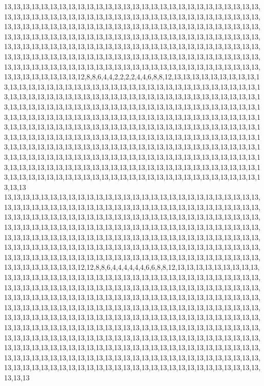 13,13,13,13,13,13,13,13,13,13,13,13,13,13,13,13,13,13,13,13,13,13,13,13,13,13,13,13,13,13,13,13,13,13,13,13,13,13,13,13,13,13,13,13,13,13,13,13,13,13,13,13,13,13,13,13,13,13,13,13,13,13,13,13,13,13,13,13,13,13,13,13,13,13,13,13,13,13,13,13,13,13,13,13,13,13,13,13,13,13,13,13,13,13,13,13,13,13,13,13,13,13,13,13,13,13,13,13,13,13,13,13,13,13,13,13,13,13,13,13,13,13,13,13,13,13,13,13,13,13,13,13,13,13,13,13,13,13,13,13,13,13,13,13,13,13,13,13,13,13,13,13,13,13,13,13,13,13,13,13,13,13,13,13,13,13,13,13,13,13,13,13,13,13,13,13,13,13,13,13,13,13,13,13,13,13,13,13,13,13,13,13,13,13,13,13,13,13,13,13,13,13,13,13,12,8,8,6,4,4,2,2,2,2,4,4,6,8,8,12,13,13,13,13,13,13,13,13,13,13,13,13,13,13,13,13,13,13,13,13,13,13,13,13,13,13,13,13,13,13,13,13,13,13,13,13,13,13,13,13,13,13,13,13,13,13,13,13,13,13,13,13,13,13,13,13,13,13,13,13,13,13,13,13,13,13,13,13,13,13,13,13,13,13,13,13,13,13,13,13,13,13,13,13,13,13,13,13,13,13,13,13,13,13,13,13,13,13,13,13,13,13,13,13,13,13,13,13,13,13,13,13,13,13,13,13,13,13,13,13,13,13,13,13,13,13,13,13,13,13,13,13,13,13,13,13,13,13,13,13,13,13,13,13,13,13,13,13,13,13,13,13,13,13,13,13,13,13,13,13,13,13,13,13,13,13,13,13,13,13,13,13,13,13,13,13,13,13,13,13,13,13,13,13,13,13,13,13,13,13,13,13,13,13,13,13,13,13,13,13,13,13,13,13,13,13,13,13,13,13,13,13,13,13,13,13,13,13,13,13,13,13,13,13,13,13,13,13,13,13,13,13,13,13,13,13,13,13,13,13,13,13,13,13,13,13,13,13,13,13,13,13,13,13,13,13,13,13,13,13,13,13,13,13,13,13,13,13,13,13,13,13,13,13,13,13,13,13,13,13,13,13,13,13,13,13,13,13,13,13,13,13
13,13,13,13,13,13,13,13,13,13,13,13,13,13,13,13,13,13,13,13,13,13,13,13,13,13,13,13,13,13,13,13,13,13,13,13,13,13,13,13,13,13,13,13,13,13,13,13,13,13,13,13,13,13,13,13,13,13,13,13,13,13,13,13,13,13,13,13,13,13,13,13,13,13,13,13,13,13,13,13,13,13,13,13,13,13,13,13,13,13,13,13,13,13,13,13,13,13,13,13,13,13,13,13,13,13,13,13,13,13,13,13,13,13,13,13,13,13,13,13,13,13,13,13,13,13,13,13,13,13,13,13,13,13,13,13,13,13,13,13,13,13,13,13,13,13,13,13,13,13,13,13,13,13,13,13,13,13,13,13,13,13,13,13,13,13,13,13,13,13,13,13,13,13,13,13,13,13,13,13,13,13,13,13,13,13,13,13,13,13,13,13,13,13,13,13,13,13,13,13,13,13,13,13,12,12,8,8,6,4,4,4,4,4,4,6,6,8,8,12,13,13,13,13,13,13,13,13,13,13,13,13,13,13,13,13,13,13,13,13,13,13,13,13,13,13,13,13,13,13,13,13,13,13,13,13,13,13,13,13,13,13,13,13,13,13,13,13,13,13,13,13,13,13,13,13,13,13,13,13,13,13,13,13,13,13,13,13,13,13,13,13,13,13,13,13,13,13,13,13,13,13,13,13,13,13,13,13,13,13,13,13,13,13,13,13,13,13,13,13,13,13,13,13,13,13,13,13,13,13,13,13,13,13,13,13,13,13,13,13,13,13,13,13,13,13,13,13,13,13,13,13,13,13,13,13,13,13,13,13,13,13,13,13,13,13,13,13,13,13,13,13,13,13,13,13,13,13,13,13,13,13,13,13,13,13,13,13,13,13,13,13,13,13,13,13,13,13,13,13,13,13,13,13,13,13,13,13,13,13,13,13,13,13,13,13,13,13,13,13,13,13,13,13,13,13,13,13,13,13,13,13,13,13,13,13,13,13,13,13,13,13,13,13,13,13,13,13,13,13,13,13,13,13,13,13,13,13,13,13,13,13,13,13,13,13,13,13,13,13,13,13,13,13,13,13,13,13,13,13,13,13,13,13,13,13,13,13,13,13,13,13,13,13,13,13,13,13,13,13,13,13,13,13,13,13,13,13,13,13,13,13
